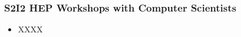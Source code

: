 \begin{frame}
\frametitle{S2I2 HEP Workshops with Computer Scientists}

\begin{itemize}
\item XXXX
\end{itemize}

\end{frame}



